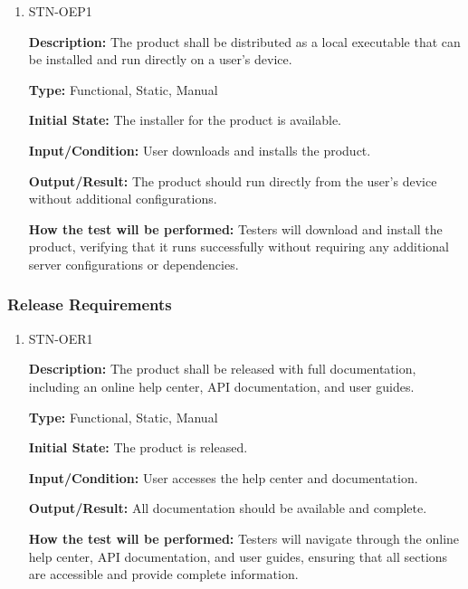 \documentclass[12pt, titlepage]{article}
\begin{document}
\begin{enumerate}

\item{STN-OEP1\\}

\textbf{Description:} The product shall be distributed as a local executable that can be installed and run directly on a user’s device.

\textbf{Type:} Functional, Static, Manual

\textbf{Initial State:} The installer for the product is available.

\textbf{Input/Condition:} User downloads and installs the product.

\textbf{Output/Result:} The product should run directly from the user’s device without additional configurations.

\textbf{How the test will be performed:} Testers will download and install the product, verifying that it runs successfully without requiring any additional server configurations or dependencies.

\end{enumerate}

\subsubsection{Release Requirements}

\begin{enumerate}

\item{STN-OER1\\}

\textbf{Description:} The product shall be released with full documentation, including an online help center, API documentation, and user guides.

\textbf{Type:} Functional, Static, Manual

\textbf{Initial State:} The product is released.

\textbf{Input/Condition:} User accesses the help center and documentation.

\textbf{Output/Result:} All documentation should be available and complete.

\textbf{How the test will be performed:} Testers will navigate through the online help center, API documentation, and user guides, ensuring that all sections are accessible and provide complete information.

\end{enumerate}
\end{document}
